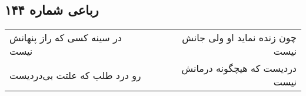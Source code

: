 \begin{center}
\section*{رباعی شماره ۱۴۴}
\label{sec:sh144}
\begin{longtable}{l p{0.5cm} r}
در سینه کسی که راز پنهانش نیست
&&
چون زنده نماید او ولی جانش نیست
\\
رو درد طلب که علتت بی‌دردیست
&&
دردیست که هیچگونه درمانش نیست
\\
\end{longtable}
\end{center}
